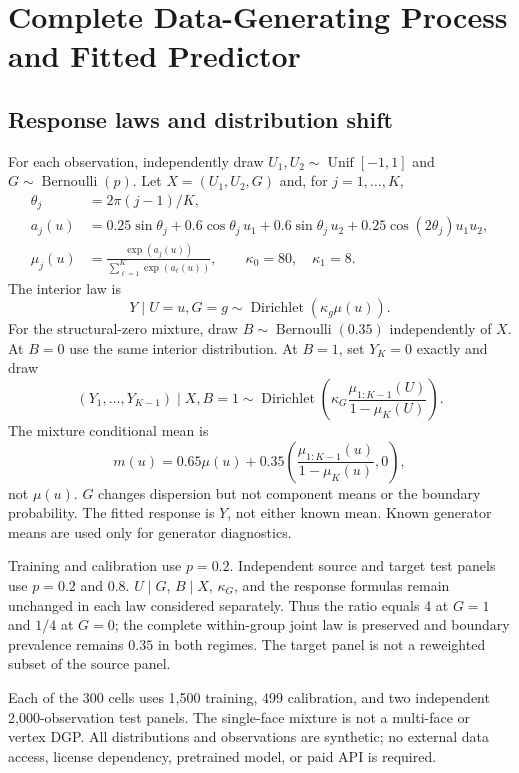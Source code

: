 \documentclass{article}
\theoremstyle{plain}
\begin{document}
\section{Complete Data-Generating Process and Fitted Predictor}
\label{app:dgp}
\subsection{Response laws and distribution shift}
For each observation, independently draw $U_1,U_2\sim\operatorname{Unif}[-1,1]$ and $G\sim\operatorname{Bernoulli}(p)$. Let $X=(U_1,U_2,G)$ and, for $j=1,\ldots,K$,
\begin{align}
 \theta_j&=2\pi(j-1)/K,\\
 a_j(u)&=0.25\sin\theta_j+0.6\cos\theta_j\,u_1
       +0.6\sin\theta_j\,u_2+0.25\cos(2\theta_j)u_1u_2,\\
 \mu_j(u)&=\frac{\exp(a_j(u))}{\sum_{\ell=1}^K\exp(a_\ell(u))},
 \qquad \kappa_0=80,\quad\kappa_1=8.
\end{align}
The interior law is
\begin{equation}
 Y\mid U=u,G=g\sim\operatorname{Dirichlet}(\kappa_g\mu(u)).
\end{equation}
For the structural-zero mixture, draw $B\sim\operatorname{Bernoulli}(0.35)$ independently of $X$. At $B=0$ use the same interior distribution. At $B=1$, set $Y_K=0$ exactly and draw
\begin{equation}
 (Y_1,\ldots,Y_{K-1})\mid X,B=1
 \sim\operatorname{Dirichlet}\left(\kappa_G\frac{\mu_{1:K-1}(U)}{1-\mu_K(U)}\right).
\end{equation}
The mixture conditional mean is
\begin{equation}
 m(u)=0.65\mu(u)+0.35\left(\frac{\mu_{1:K-1}(u)}{1-\mu_K(u)},0\right),
\end{equation}
not $\mu(u)$. $G$ changes dispersion but not component means or the boundary probability. The fitted response is $Y$, not either known mean. Known generator means are used only for generator diagnostics.

Training and calibration use $p=0.2$. Independent source and target test panels use $p=0.2$ and $0.8$. $U\mid G$, $B\mid X$, $\kappa_G$, and the response formulas remain unchanged in each law considered separately. Thus the ratio equals 4 at $G=1$ and $1/4$ at $G=0$; the complete within-group joint law is preserved and boundary prevalence remains $0.35$ in both regimes. The target panel is not a reweighted subset of the source panel.

Each of the 300 cells uses 1,500 training, 499 calibration, and two independent 2,000-observation test panels. The single-face mixture is not a multi-face or vertex DGP. All distributions and observations are synthetic; no external data access, license dependency, pretrained model, or paid API is required.
\end{document}
